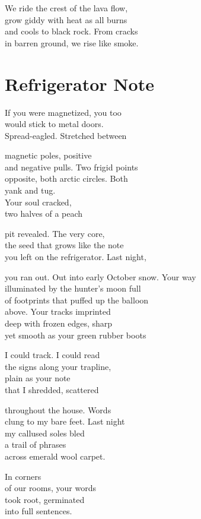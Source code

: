 \documentclass[twoside,10pt]{book}
\begin{document}
We ride the crest of the lava flow,\\
grow giddy with heat as all burns\\
and cools to black rock. From cracks\\
in barren ground, we rise like smoke.


\clearpage
\section{Refrigerator Note}

If you were magnetized, you too\\
would stick to metal doors.\\
Spread-eagled. Stretched between

magnetic poles, positive\\
and negative pulls. Two frigid points\\
opposite, both arctic circles. Both\\
yank and tug.\\
Your soul cracked,\\
two halves of a peach

pit revealed. The very core,\\
the seed that grows like the note\\
you left on the refrigerator. Last night,

you ran out. Out into early October snow. Your way\\
illuminated by the hunter's moon full\\
of footprints that puffed up the balloon\\
above. Your tracks imprinted\\
deep with frozen edges, sharp\\
yet smooth as your green rubber boots

I could track. I could read\\
the signs along your trapline,\\
plain as your note\\
that I shredded, scattered

throughout the house. Words\\
clung to my bare feet. Last night\\
my callused soles bled\\
a trail of phrases\\
across emerald wool carpet.

In corners\\
of our rooms, your words\\
took root, germinated\\
into full sentences.
\end{document}
